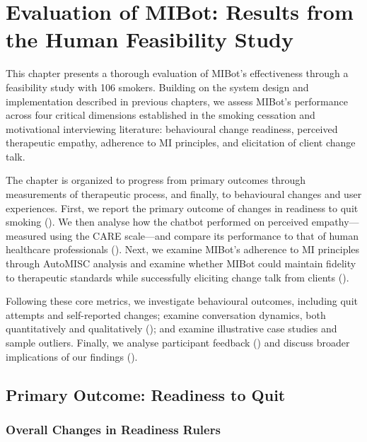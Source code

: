 \chapter{Evaluation of MIBot: Results from the Human Feasibility Study}
\label{ch:mibot-eval}

This chapter presents a thorough evaluation of MIBot's effectiveness through a feasibility study with 106 smokers. Building on the system design and implementation described in previous chapters, we assess MIBot's performance across four critical dimensions established in the smoking cessation and motivational interviewing literature: behavioural change readiness, perceived therapeutic empathy, adherence to MI principles, and elicitation of client change talk.

The chapter is organized to progress from primary outcomes through measurements of therapeutic process, and finally, to behavioural changes and user experiences. First, we report the primary outcome of changes in readiness to quit smoking (). We then analyse how the chatbot performed on perceived empathy—measured using the CARE scale—and compare its performance to that of human healthcare professionals (). Next, we examine MIBot's adherence to MI principles through AutoMISC analysis and examine whether MIBot could maintain fidelity to therapeutic standards while successfully eliciting change talk from clients ().

Following these core metrics, we investigate behavioural outcomes, including quit attempts and self-reported changes; examine conversation dynamics, both quantitatively and qualitatively (); and examine illustrative case studies and sample outliers. Finally, we analyse participant feedback () and discuss broader implications of our findings ().

\section{Primary Outcome: Readiness to Quit}
\label{sec:primary-outcome}

\subsection*{Overall Changes in Readiness Rulers}

